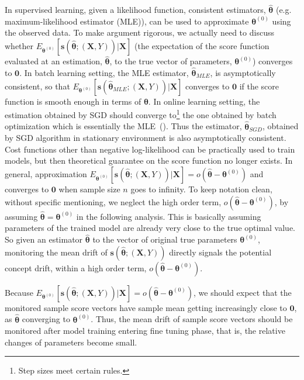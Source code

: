 \documentclass[twoside,11pt]{article}
\begin{document}
In supervised learning, given a likelihood function, consistent estimators, $\hat {\bm {\theta}}$ (e.g. maximum-likelihood estimator (MLE)), can be used to approximate {$\bm { \theta}^{ (0)}$} using the observed data. To make argument rigorous, we actually need to discuss whether $E_{\bm { \theta} ^{ (0)}}[\bm{s}(\hat{\bm { \theta}};(\bm {X}, Y))|\bm {X}]$ (the expectation of the score function evaluated at an estimation, $\hat { \bm { \theta}}$, to the true vector of parameters, $\bm { \theta} ^{ (0)}$) converges to $\bm {0}$. In batch learning setting, the MLE estimator, $\hat { \bm { \theta}}_ {MLE}$, is asymptotically consistent, so that $E_{\bm { \theta} ^{ (0)}}[\bm{s}(\hat{\bm { \theta}} _{MLE};(\bm {X}, Y))|\bm {X}]$ converges to $\bm {0}$ if the score function is smooth enough in terms of $\bm { \theta}$. In online learning setting, the estimation obtained by SGD should converge to\footnote{Step sizes meet certain rules.} the one obtained by batch optimization which is essentially the MLE~(\cite{bottou2018optimization}). Thus the estimator, $\hat {\bm { \theta}} _{SGD} $, obtained by SGD algorithm in stationary environment is also asymptotically consistent. Cost functions other than negative log-likelihood can be practically used to train models, but then theoretical guarantee on the score function no longer exists. In general, approximation {$E _{\bm { \theta} ^{ (0)}}[\bm{s}(\hat{\bm { \theta}};(\bm {X}, Y))|\bm{X}] = o (\hat{\bm { \theta}} - \bm { \theta}^{ (0)}) $} and converges to $\bm {0}$ when sample size $n$ goes to infinity.  To {keep notation clean}, without specific mentioning, we neglect the high order term, $o(\hat{\bm { \theta}} - \bm { \theta} ^{ (0)})$, by assuming {$\hat {\bm { \theta}} = \bm { \theta}^{ (0)}$} in the following analysis. This is basically assuming parameters of the trained model are already very close to the true optimal value. So given an estimator $\hat {\bm { \theta}}$ to the vector of original true parameters $\bm { \theta}^{(0)}$, monitoring the mean {drift} of $\bm{s} (\hat{\bm { \theta}};(\bm {X}, Y))$ directly signals the potential concept drift, within a high order term, {$o(\hat{\bm { \theta}} - \bm { \theta} ^{ (0)})$.}

Because $E _{\bm { \theta} ^{ (0)}}[\bm{s}(\hat{\bm { \theta}};(\bm {X}, Y))|\bm{X}] = o (\hat{\bm { \theta}} - \bm { \theta}^{ (0)}) $, we should expect that the monitored sample score vectors have sample mean getting increasingly close to $\bm {0}$, as $\hat {\bm { \theta}}$ converging to $\bm { \theta} ^{ (0)}$. Thus, the mean drift of sample score vectors should be monitored after model training entering fine tuning phase, that is, the relative changes of parameters become small.
\end{document}
